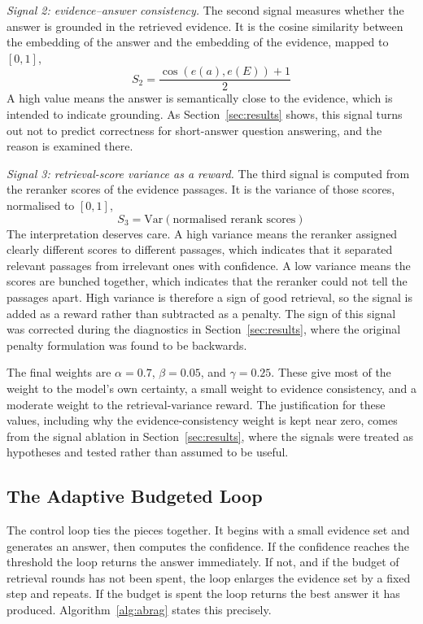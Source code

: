 \documentclass[conference,a4paper,10pt]{IEEEtran}
\begin{document}
\textit{Signal 2: evidence--answer consistency.}
The second signal measures whether the answer is grounded in the retrieved evidence. It
is the cosine similarity between the embedding of the answer and the embedding of the
evidence, mapped to $[0,1]$,
\begin{equation}
S_2 = \frac{\cos\!\left(e(a), e(E)\right) + 1}{2}
\end{equation}
A high value means the answer is semantically close to the evidence, which is intended to
indicate grounding. As Section~\ref{sec:results} shows, this signal turns out not to
predict correctness for short-answer question answering, and the reason is examined there.

\textit{Signal 3: retrieval-score variance as a reward.}
The third signal is computed from the reranker scores of the evidence passages. It is the
variance of those scores, normalised to $[0,1]$,
\begin{equation}
S_3 = \text{Var}\!\left(\text{normalised rerank scores}\right)
\end{equation}
The interpretation deserves care. A high variance means the reranker assigned clearly
different scores to different passages, which indicates that it separated relevant
passages from irrelevant ones with confidence. A low variance means the scores are
bunched together, which indicates that the reranker could not tell the passages apart.
High variance is therefore a sign of good retrieval, so the signal is added as a reward
rather than subtracted as a penalty. The sign of this signal was corrected during the
diagnostics in Section~\ref{sec:results}, where the original penalty formulation was
found to be backwards.

The final weights are $\alpha = 0.7$, $\beta = 0.05$, and $\gamma = 0.25$. These give
most of the weight to the model's own certainty, a small weight to evidence consistency,
and a moderate weight to the retrieval-variance reward. The justification for these
values, including why the evidence-consistency weight is kept near zero, comes from the
signal ablation in Section~\ref{sec:results}, where the signals were treated as
hypotheses and tested rather than assumed to be useful.

\subsection{The Adaptive Budgeted Loop}
The control loop ties the pieces together. It begins with a small evidence set and
generates an answer, then computes the confidence. If the confidence reaches the
threshold the loop returns the answer immediately. If not, and if the budget of retrieval
rounds has not been spent, the loop enlarges the evidence set by a fixed step and repeats.
If the budget is spent the loop returns the best answer it has produced.
Algorithm~\ref{alg:abrag} states this precisely.
\end{document}
